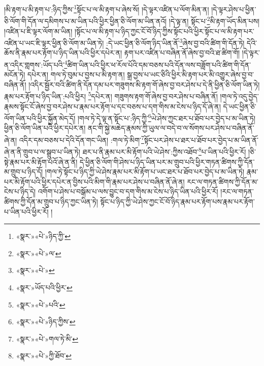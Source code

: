 །མི་རྟག་པ་མི་རྟག་པ་:ཉིད་ཀྱིས་\footnote{«སྣར་»«པེ་»ཉིད་ཀྱི་}སྟོང་པ་ལ་མི་རྟག་པ་ཞེས་སོ། །དེ་ལྟར་འཛིན་པ་ལོག་མིན་ན། །དེ་ལྟར་ཤེས་པ་ཕྱིན་ཅི་ལོག་གི་དོན་ལ་དམིགས་པ་མ་ཡིན་པའི་ཕྱིར་ཕྱིན་ཅི་ལོག་མ་ཡིན་ནའོ། །དེ་ལྟ་ན། སྟོང་པ་\footnote{«སྣར་»«པེ་»ལ་}མི་རྟག་ཡོད་མིན་པས། །འཛིན་པ་ཇི་ལྟར་ལོག་མ་ཡིན། །སྟོང་པ་ལ་མི་རྟག་པ་ཉིད་ཀྱང་ངོ་བོ་ཉིད་ཀྱིས་སྟོང་པའི་ཕྱིར་སྟོང་པ་ལ་མི་རྟག་པར་འཛིན་པ་ཡང་ཇི་ལྟར་ཕྱིན་ཅི་ལོག་མ་ཡིན་ཏེ། :དེ་ཡང་ཕྱིན་ཅི་ལོག་ཉིད་ཡིན་ནོ་\footnote{«སྣར་»«པེ་»}ཞེས་བྱ་བའི་ཚིག་གི་དོན་ཏེ། དེའི་ཆོས་ནི་རྣམ་པར་རྟོག་པ་ཉིད་ཡིན་པའི་ཕྱིར་དཔེར་ན། རྟག་པར་འཛིན་པ་བཞིན་ནོ་ཞེས་བྱ་བའི་ཐ་ཚིག་གོ། །དེ་ལྟར་ན་འདིར་གླགས་:ཡོད་པའི་\footnote{«སྣར་»ཡོད་པའི་ཕྱིར་}ཚིག་ཡིན་པའི་ཕྱིར་ཕ་རོལ་པོའི་དམ་བཅས་པའི་དོན་ལས་བཟློག་པའི་ཚིག་གི་དོན་མངོན་ཏེ། དཔེར་ན། གལ་ཏེ་བུམ་པ་བྱས་པ་མི་རྟག་ན། སྒྲ་བྱས་པ་ཡང་ཅིའི་ཕྱིར་མི་རྟག་པར་མི་འགྱུར་ཞེས་བྱ་བ་བཞིན་ནོ། །འདིར་སྦྱོར་བའི་ཚིག་ནི་དོན་དམ་པར་གཟུགས་མི་རྟག་གོ་ཞེས་བྱ་བར་ཤེས་པ་དེ་ནི་ཕྱིན་ཅི་ལོག་ཡིན་ཏེ། རྣམ་པར་རྟོག་པ་ཉིད་ཡིན་:པའི་ཕྱིར། \footnote{«སྣར་»«པེ་»པའི་}དཔེར་ན། གཟུགས་རྟག་གོ་ཞེས་བྱ་བར་ཤེས་པ་བཞིན་ནོ། །གལ་ཏེ་འདུ་བྱེད་རྣམས་སྟོང་ངོ་ཞེས་བྱ་བར་ཤེས་པ་རྣམ་པར་རྟོག་པ་དང་བཅས་པ་དག་གིས་མ་ངེས་པ་ཉིད་དོ་ཞེ་ན། དེ་ཡང་ཕྱིན་ཅི་ལོག་ཡིན་པའི་ཕྱིར་སྐྱོན་མེད་དོ། །གལ་ཏེ་དེ་ལྟ་ན་སྟོང་པ་:ཉིད་ཀྱི་\footnote{«སྣར་»«པེ་»ཉིད་ཀྱིས་}ཡེ་ཤེས་ཀྱང་ཐར་པ་ཐོབ་པར་བྱེད་པ་མ་ཡིན་ཏེ། ཕྱིན་ཅི་ལོག་ཡིན་པའི་ཕྱིར་དཔེར་ན། ནང་གི་སྐྱེ་མཆེད་རྣམས་ཀྱི་ཡུལ་ལ་བདེ་བ་ལ་སོགས་པར་ཤེས་པ་བཞིན་ནོ་ཞེ་ན། འདིར་དམ་བཅས་པ་དེའི་དོན་གང་ཡིན། :གལ་ཏེ་མིག་\footnote{«སྣར་»«པེ་»གལ་ཏེ་མི་}སྟོང་པར་ཤེས་པ་ཐར་པ་ཐོབ་པར་བྱེད་པ་མ་ཡིན་ནོ་ཞེ་ན་ནི་གྲུབ་པ་ལ་སྒྲུབ་པ་ཡིན་ཏེ། ཐར་པ་ནི་རྣམ་པར་མི་རྟོག་པའི་ཡེ་ཤེས་:ཀྱིས་འཐོབ་\footnote{«སྣར་»«པེ་»ཀྱི་ཐོབ་}པ་ཡིན་པའི་ཕྱིར་རོ། །ཅི་སྟེ་རྣམ་པར་མི་རྟོག་པའོ་ཞེ་ན་ནི། དེ་ཕྱིན་ཅི་ལོག་གི་ཤེས་པ་ཉིད་ཡིན་པར་མ་གྲུབ་པའི་ཕྱིར་གཏན་ཚིགས་ཀྱི་དོན་མ་གྲུབ་པ་ཉིད་དོ། །གལ་ཏེ་སྟོང་པ་ཉིད་ཀྱི་ཡེ་ཤེས་རྣམ་པར་མི་རྟོག་པ་ཡང་ཐར་པ་ཐོབ་པར་བྱེད་པ་མ་ཡིན་ཏེ། རྣམ་པར་མི་རྟོག་པའི་ཕྱིར་དཔེར་ན་བྱིས་པའི་མིག་གི་རྣམ་པར་ཤེས་པ་བཞིན་ནོ་ཞེ་ན། རང་ལ་གཏན་ཚིགས་ཀྱི་དོན་མ་ངེས་པ་ཉིད་དེ། འགོག་པ་ཤེས་པ་བསྒོམ་པ་ལས་བྱུང་བ་དག་གིས་མ་ངེས་པ་ཉིད་ཡིན་པའི་ཕྱིར་རོ། །རང་ལ་གཏན་ཚིགས་ཀྱི་དོན་མ་གྲུབ་པ་ཉིད་ཀྱང་ཡིན་ཏེ། སྟོང་པ་ཉིད་ཀྱི་ཡེ་ཤེས་ཀྱང་ངོ་བོ་ཉིད་རྣམ་པར་རྟོག་པས་རྣམ་པར་རྟོག་པ་ཡིན་པའི་ཕྱིར་རོ། །
